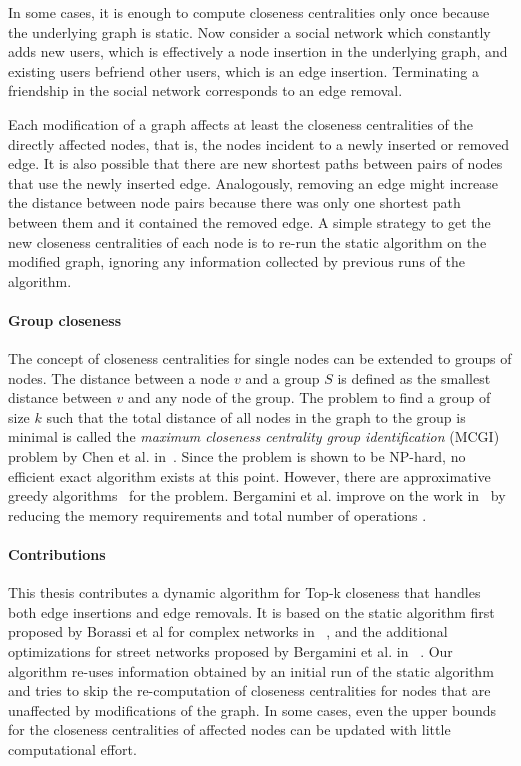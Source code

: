 In some cases, it is enough to compute closeness centralities only once because the underlying graph is static. Now consider a social network which constantly adds new users, which is effectively a node insertion in the underlying graph, and existing users befriend other users, which is an edge insertion. Terminating a friendship in the social network corresponds to an edge removal.

Each modification of a graph affects at least the closeness centralities of the directly affected nodes, that is, the nodes incident to a newly inserted or removed edge. It is also possible that there are new shortest paths between pairs of nodes that use the newly inserted edge. Analogously, removing an edge might increase the distance between node pairs because there was only one shortest path between them and it contained the removed edge. A simple strategy to get the new closeness centralities of each node is to re-run the static algorithm on the modified graph, ignoring any information collected by previous runs of the algorithm.

\paragraph{Group closeness}
The concept of closeness centralities for single nodes can be extended to groups of nodes. The distance between a node $v$ and a group $S$ is defined as the smallest distance between $v$ and any node of the group. The problem to find a group of size $k$ such that the total distance of all nodes in the graph to the group is minimal is called the \emph{maximum closeness centrality group identification} (MCGI) problem by Chen et al. in~\cite{Chen2016}. Since the problem is shown to be NP-hard, no efficient exact algorithm exists at this point. However, there are approximative greedy algorithms~\cite{Chen2016,zhao2014measuring} for the problem. Bergamini et al. improve on the work in~\cite{Chen2016} by reducing the memory requirements and total number of operations .

\paragraph{Contributions}
This thesis contributes a dynamic algorithm for Top-k closeness that handles both edge insertions and edge removals. It is based on the static algorithm first proposed by Borassi et al for complex networks in ~\cite{borassi2015fast}, and the additional optimizations for street networks proposed by Bergamini et al. in ~\cite{bergamini2016computing}. Our algorithm re-uses information obtained by an initial run of the static algorithm and tries to skip the re-computation of closeness centralities for nodes that are unaffected by modifications of the graph. In some cases, even the upper bounds for the closeness centralities of affected nodes can be updated with little computational effort.

